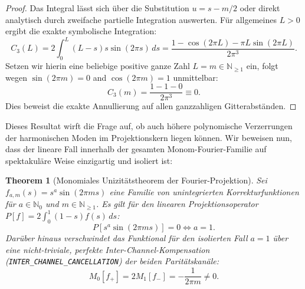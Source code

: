 \documentclass[11pt,a4paper]{article}
\newtheorem{theorem}{Theorem}[section]
\theoremstyle{definition}
\begin{document}
	\begin{proof}
		Das Integral lässt sich über die Substitution $u = s - m/2$ oder direkt analytisch durch zweifache partielle Integration auswerten. Für allgemeines $L > 0$ ergibt die exakte symbolische Integration:
		\begin{equation}
			C_3(L) = 2 \int_0^L (L-s)s \sin(2\pi s) \, ds = \frac{1 - \cos(2\pi L) - \pi L \sin(2\pi L)}{2\pi^3}.
		\end{equation}
		Setzen wir hierin eine beliebige positive ganze Zahl $L = m \in \mathbb{N}_{\ge 1}$ ein, folgt wegen $\sin(2\pi m) = 0$ and $\cos(2\pi m) = 1$ unmittelbar:
		\begin{equation}
			C_3(m) = \frac{1 - 1 - 0}{2\pi^3} \equiv 0.
		\end{equation}
		Dies beweist die exakte Annullierung auf allen ganzzahligen Gitterabständen.
	\end{proof}
	
	Dieses Resultat wirft die Frage auf, ob auch höhere polynomische Verzerrungen der harmonischen Moden im Projektionskern liegen können. Wir beweisen nun, dass der lineare Fall innerhalb der gesamten Monom-Fourier-Familie auf spektakuläre Weise einzigartig und isoliert ist:
	
	\begin{theorem}[Monomiales Unizitätstheorem der Fourier-Projektion]
		\label{thm:fourier_uniqueness}
		Sei $f_{a,m}(s) = s^a \sin(2\pi m s)$ eine Familie von unintegrierten Korrekturfunktionen für $a \in \mathbb{N}_0$ und $m \in \mathbb{N}_{\ge 1}$. Es gilt für den linearen Projektionsoperator $P[f] = 2\int_0^1 (1-s)f(s)\,ds$:
		\begin{equation}
			P\left[s^a \sin(2\pi m s)\right] = 0 \iff a = 1.
		\end{equation}
		Darüber hinaus verschwindet das Funktional für den isolierten Fall $a=1$ über eine nicht-triviale, perfekte Inter-Channel-Kompensation (\texttt{INTER\_CHANNEL\_CANCELLATION}) der beiden Paritätskanäle:
		\begin{equation}
			M_0[f_+] = 2 M_1[f_-] = -\frac{1}{2\pi m} \neq 0.
		\end{equation}
	\end{theorem}
	
\end{document}

